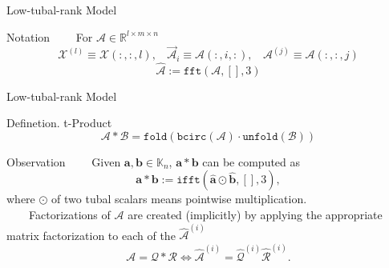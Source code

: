 \documentclass[t, 10pt, handout, aspectratio=169]{beamer}
\begin{document}
\begin{frame}{Low-tubal-rank Model}
\begin{block}{Notation}
~~~~For $\mathcal{A}\in\mathbb{R}^{l\times m\times n}$ 
$$\mathcal{X}^{(l)}\equiv\mathcal{X}(:,:,l),~~~~\vec{\mathcal{A}}_i\equiv\mathcal{A}(:,i,:),~~~~\mathcal{A}^{(j)}\equiv\mathcal{A}(:,:,j)$$
$$\hat{\mathcal{A}} := \texttt{fft}(\mathcal{A}, [], 3)$$
\end{block}
\end{frame}

\begin{frame}{Low-tubal-rank Model}
\begin{block}{Definetion. t-Product}
$$\mathcal{A}*\mathcal{B}=\texttt{fold}(\texttt{bcirc}(\mathcal{A})\cdot\texttt{unfold}(\mathcal{B}))$$
\end{block}
\begin{block}{Observation}
~~~~Given $\mathbf{a}, \mathbf{b} \in \mathbb{K}_n$, $\mathbf{a} * \mathbf{b}$ can be computed as
$$
\mathbf{a} * \mathbf{b} := \texttt{ifft}(\hat{\mathbf{a}} \odot \hat{\mathbf{b}}, [], 3),
$$
where $\odot$ of two tubal scalars means pointwise multiplication.\\
~~~~Factorizations of $\mathcal{A}$ are created (implicitly) by applying the appropriate matrix factorization to each of the $\hat{\mathcal{A}}^{(i)}$
$$
\mathcal{A}=\mathcal{Q} * \mathcal{R} \Longleftrightarrow \hat{\mathcal{A}}^{(i)}=\hat{\mathcal{Q}}^{(i)}\hat{\mathcal{R}}^{(i)}.
$$
\end{block}
\end{frame}

\end{document}
